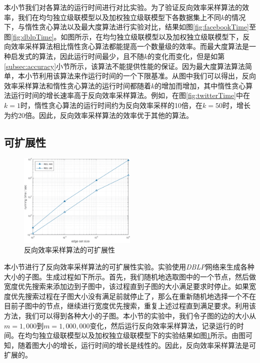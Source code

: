 本小节我们对各算法的运行时间进行对比实验。为了验证反向效率采样算法的效率，我们在均匀独立级联模型以及加权独立级联模型下各数据集上不同$k$的情况下，与惰性贪心算法以及最大度算法进行实验对比，结果如图\ref{fig:facebookTime}至图\ref{fig:dblpTime}。如图所示，在均匀独立级联模型以及加权独立级联模型下，反向效率采样算法相比惰性贪心算法都能提高一个数量级的效率。而最大度算法是一种启发式的算法，因此运行时间最少，且不随$k$的变化而变化，但是如第\ref{subsec:accuracy}小节所示，该算法不能提供性能的保证。因为最大度算法算法简单，本小节利用该算法来作运行时间的一个下限基准。从图中我们可以得出，反向效率采样算法和惰性贪心算法的运行时间都随着$k$的增加而增加，其中惰性贪心算法运行时间的增长速率高于反向效率采样算法。例如，在图\ref{fig:twitterTime}中在$k=1$时，惰性贪心算法的运行时间约为反向效率采样的10倍，在$k=50$时，增长为约20倍。因此，反向效率采样算法的效率优于其他的算法。

\subsection{可扩展性}
\label{subsec:scalability}
\begin{figure}[ht]
    \centering
    \includegraphics[width=0.5\textwidth]{figures/resScalability.eps}
    \caption{反向效率采样算法的可扩展性}
    \label{fig:scalability}
\end{figure}

本小节进行了反向效率采样算法的可扩展性实验。实验使用\textit{DBLP}网络来生成各种大小的子图。生成过程如下所示。首先，我们随机地选取图中的一个节点，然后做宽度优先搜索来添加边到子图中，该过程直到子图的大小满足要求时停止。如果宽度优先搜索过程在子图大小没有满足前就停止了，那么在重新随机地选择一个不在目前子图中的节点，继续进行宽度优先搜索，重复上述过程直到满足要求。利用该方法，我们可以得到各种大小的子图。本小节的实验中，我们令子图的边的大小从$m=1,000$到$m=1,000,000$变化，然后运行反向效率采样算法，记录运行的时间。在均匀独立级联模型以及加权独立级联模型下的实验结果如图\ref{fig:scalability}所示。由图可知，随着图大小的增长，运行时间的增长是线性的。因此，反向效率采样算法是可扩展的。
